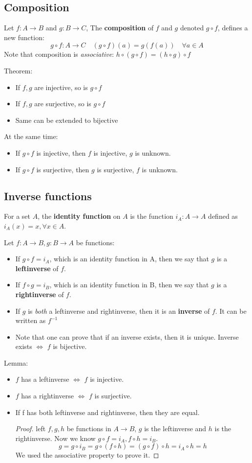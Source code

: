 \documentclass[letterpaper,12pt]{article}
\begin{document}
\subsection{Composition}
Let $f:A\to B$ and $g:B\to C$, The \textbf{composition} of $f$ and $g$ denoted $g \circ f$, defines a new function: 
\[g \circ f : A\to C \quad (g\circ f)(a)=g(f(a))\quad \forall a\in A\]
Note that composition is \textit{associative}: $h\circ(g\circ f)=(h\circ g)\circ f$

Theorem:
\begin{itemize}
    \item If $f,g$ are injective, so is $g\circ f$
    \item If $f,g$ are surjective, so is $g\circ f$
    \item Same can be extended to bijective
\end{itemize}

At the same time:
\begin{itemize}
    \item If $g\circ f$ is injective, then $f$ is injective, $g$ is unknown.
    \item If $g\circ f$ is surjective, then $g$ is surjective, $f$ is unknown.
\end{itemize}

\subsection{Inverse functions}
For a set $A$, the \textbf{identity function} on $A$ is the function $i_A:A\to A$ defined as $i_A(x)=x,\forall x \in A$.  

Let $f:A\to B, g:B\to A$ be functions:
\begin{itemize}
    \item If $g\circ f=i_A$, which is an identity function in A, then we say that $g$ is a \textbf{left\-inverse} of $f$.
    \item If $f\circ g=i_B$, which is an identity function in B, then we say that $g$ is a \textbf{right\-inverse} of $f$.
    \item If $g$ is \textit{both} a left\-inverse and right\-inverse, then it is an \textbf{inverse} of $f$. It can be written as $f^{-1}$
    \item Note that one can prove that if an inverse exists, then it is unique. Inverse exists $\iff$ $f$ is bijective.
\end{itemize}
Lemma:
\begin{itemize}
    \item $f$ has a left\-inverse $\iff$ $f$ is injective.
    \item $f$ has a right\-inverse $\iff$ $f$ is surjective.
    \item If f has both left\-inverse and right\-inverse, then they are equal.\begin{proof}
        left $f,g,h$ be functions in $A\to B$, $g$ is the left\-inverse and $h$ is the right\-inverse. Now we know $g\circ f = i_A, f\circ h=i_B$.
        \[g=g\circ i_B=g\circ(f\circ h)=(g\circ f)\circ h=i_A\circ h =h\]
        We used the associative property to prove it. 
    \end{proof}
\end{itemize}
\end{document}
